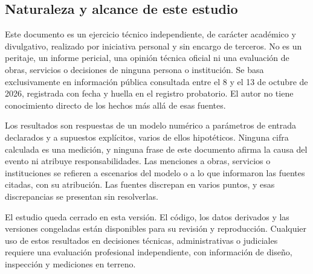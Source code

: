 \subsection*{Naturaleza y alcance de este estudio}
Este documento es un ejercicio técnico independiente, de carácter académico y divulgativo, realizado por iniciativa personal y sin encargo de terceros. No es un peritaje, un informe pericial, una opinión técnica oficial ni una evaluación de obras, servicios o decisiones de ninguna persona o institución. Se basa exclusivamente en información pública consultada entre el 8 y el 13 de octubre de 2026, registrada con fecha y huella en el registro probatorio. El autor no tiene conocimiento directo de los hechos más allá de esas fuentes.

Los resultados son respuestas de un modelo numérico a parámetros de entrada declarados y a supuestos explícitos, varios de ellos hipotéticos. Ninguna cifra calculada es una medición, y ninguna frase de este documento afirma la causa del evento ni atribuye responsabilidades. Las menciones a obras, servicios o instituciones se refieren a escenarios del modelo o a lo que informaron las fuentes citadas, con su atribución. Las fuentes discrepan en varios puntos, y esas discrepancias se presentan sin resolverlas.

El estudio queda cerrado en esta versión. El código, los datos derivados y las versiones congeladas están disponibles para su revisión y reproducción. Cualquier uso de estos resultados en decisiones técnicas, administrativas o judiciales requiere una evaluación profesional independiente, con información de diseño, inspección y mediciones en terreno.
